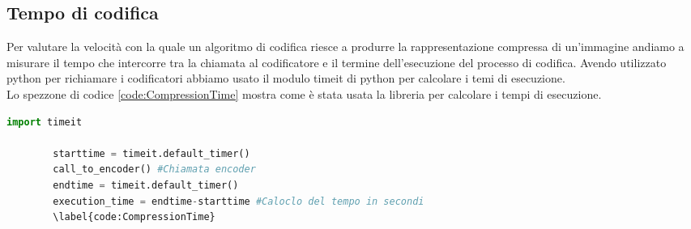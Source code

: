 \subsection{Tempo di codifica}
Per valutare la velocità con la quale un algoritmo di codifica riesce a produrre la rappresentazione compressa di un’immagine andiamo a misurare il tempo che intercorre tra la chiamata al codificatore e il termine dell’esecuzione del processo di codifica. Avendo utilizzato python per richiamare i codificatori abbiamo usato il modulo timeit di python per calcolare i temi di esecuzione.\\
Lo spezzone di codice \ref{code:CompressionTime} mostra come è stata usata la libreria per calcolare i tempi di esecuzione.\\
\begin{adjustbox}{max width=\textwidth}
    \begin{lstlisting}[language=Python, caption=Spezzone di codice per il calcolo del tempo di compressione, label=code:CompressionTime]
        import timeit
        
        starttime = timeit.default_timer()
        call_to_encoder() #Chiamata encoder
        endtime = timeit.default_timer()
        execution_time = endtime-starttime #Caloclo del tempo in secondi 
        \label{code:CompressionTime}
    \end{lstlisting}
\end{adjustbox}

    
